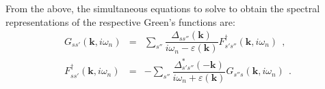 \documentclass[a4j]{jsarticle}
\begin{document}
%
%
%
%
From the above, the simultaneous equations to solve to obtain the spectral representations of the respective Green's functions are:
%
%
%
%
\begin{eqnarray}
	G_{ss'}(\bm{k} , i \omega_{n} )
	&=&
	\sum_{s''}
	\dfrac{
		\Delta_{ s s'' }( \bm{k} )
	}{
		i \omega_{n} - \varepsilon( \bm{k} )
	}
	F_{ s' s'' }^{\dagger} ( \bm{k} , i \omega_{n} )
	\ \ ,
	\\[4mm]
	F_{ss'}^{\dagger} (\bm{k} , i \omega_{n} )
	&=&
	-
	\sum_{ s'' }
	\dfrac{
		\Delta_{ s' s'' }^{*} ( - \bm{k} )
	}
	{
		i \omega_{n} + \varepsilon( \bm{k} )
	}
	G_{s''s} (\bm{k} , i \omega_{n} )
	\ \ .
\end{eqnarray}
%
%
%
%
\end{document}
